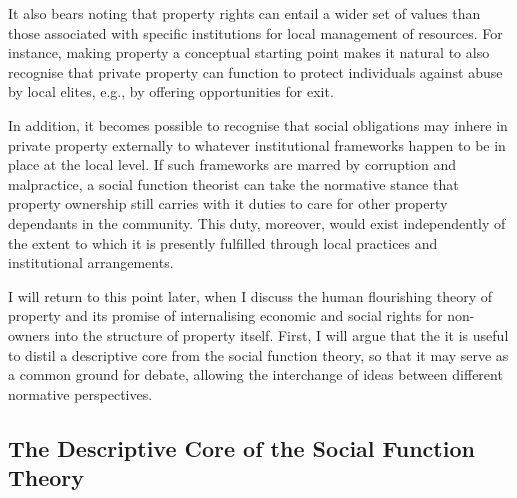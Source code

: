 It also bears noting that property rights can entail a wider set of values than those associated with specific institutions for local management of resources. For instance, making property a conceptual starting point makes it natural to also recognise that private property can function to protect individuals against abuse by local elites, e.g., by offering opportunities for exit. 

In addition, it becomes possible to recognise that social obligations may inhere in private property externally to whatever institutional frameworks happen to be in place at the local level. If such frameworks are marred by corruption and malpractice, a social function theorist can take the normative stance that property ownership still carries with it duties to care for other property dependants in the community. This duty, moreover, would exist independently of the extent to which it is presently fulfilled through local practices and institutional arrangements. 

I will return to this point later, when I discuss the human flourishing theory of property and its promise of internalising economic and social rights for non-owners into the structure of property itself. First, I will argue that the it is useful to distil a descriptive core from the social function theory, so that it may serve as a common ground for debate, allowing the interchange of ideas between different normative perspectives. 

\subsection{The Descriptive Core of the Social Function Theory}

